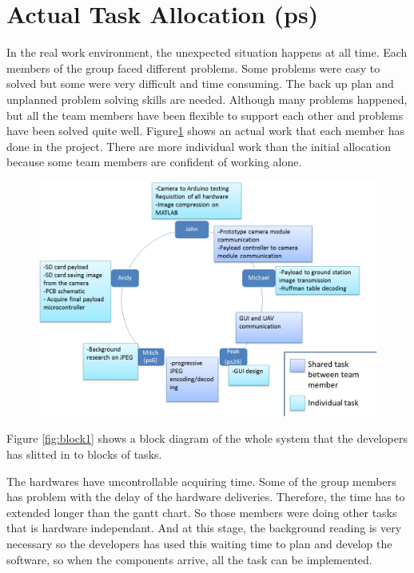 \section{Actual Task Allocation (ps)}
In the real work environment, the unexpected situation happens at all time. 
Each members of the group faced different problems.
Some problems were easy to solved but some were very difficult and time consuming. 
The back up plan and unplanned problem solving skills are needed. 
Although many problems happened, but all the team members have been flexible to support each other and problems have been solved quite well. Figure\ref{final task allocation} shows an actual work that each member has done in the project. There are more individual work than the initial allocation because some team members are confident of working alone.

\begin{figure}[H]
        \centering
\includegraphics[width=1.0\textwidth]{figures/finalWorkAllocation.png} 
        \label{final task allocation}
\end{figure}

Figure \ref{fig:block1} shows a block diagram of the whole system that the developers has slitted in to blocks of tasks. 

The hardwares have uncontrollable acquiring time. 
Some of the group members has problem with the delay of the hardware deliveries. Therefore, the time has to extended longer than the gantt chart. 
So those members were doing other tasks that is hardware independant. 
And at this stage, the background reading is very necessary so the developers has used this waiting time to plan and develop the software, so when the components arrive, all the task can be implemented.

